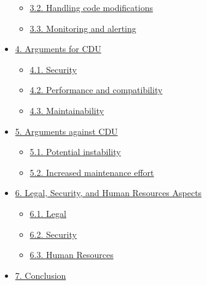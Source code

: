 \documentclass[10pt]{article}
\begin{document}
\begin{itemize}
\begin{itemize}
    \item \href{#32-handling-code-modifications}{3.2. Handling code modifications}

    \item \href{#33-monitoring-and-alerting}{3.3. Monitoring and alerting}

  \end{itemize}

  \item \href{#arguments-for-cdu}{4. Arguments for CDU}

  \begin{itemize}

    \item \href{#41-security}{4.1. Security}

    \item \href{#42-performance-and-compatibility}{4.2. Performance and compatibility}

    \item \href{#43-maintainability}{4.3. Maintainability}

  \end{itemize}

  \item \href{#arguments-against-cdu}{5. Arguments against CDU}

  \begin{itemize}

    \item \href{#51-potential-instability}{5.1. Potential instability}

    \item \href{#52-increased-maintenance-effort}{5.2. Increased maintenance effort}

  \end{itemize}

  \item \href{#legal-security-and-human-resources-aspects}{6. Legal, Security, and Human Resources Aspects}

  \begin{itemize}

    \item \href{#61-legal}{6.1. Legal}

    \item \href{#62-security}{6.2. Security}

    \item \href{#63-human-resources}{6.3. Human Resources}

  \end{itemize}

  \item \href{#conclusion}{7. Conclusion}

\end{itemize}
\end{document}

